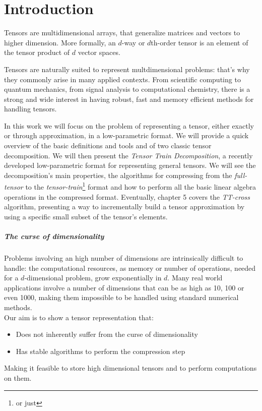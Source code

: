 \chapter{Introduction}
Tensors are multidimensional arrays, that generalize matrices and vectors to higher dimension. More formally, an $d$-way or $d$th-order tensor is an element of the tensor product of $d$ vector spaces.

Tensors are naturally suited to represent multdimensional problems: that's why they commonly arise in many applied contexts. From scientific computing to quantum mechanics, from signal analysis to computational chemistry, there is a strong and wide interest in having robust, fast and memory efficient methods for handling tensors.

In this work we will focus on the problem of representing a tensor, either exactly or through approximation, in a low-parametric format.
We will provide a quick overview of the basic definitions and tools and of two classic tensor decomposition. We will then present the \emph{Tensor Train Decomposition}, a recently developed low-parametric format for representing general tensors. We will see the decomposition's main properties, the algorithms for compressing from the \emph{full-tensor} to the \emph{tensor-train}\footnote{or just } format and how to perform all the basic linear algebra operations in the compressed format. Eventually, chapter 5 covers the \emph{TT-cross} algorithm, presenting a way to incrementally build a tensor approximation by using a specific small subset of the tensor's elements.

\paragraph{The curse of dimensionality}
Problems involving an high number of dimensions are intrinsically difficult to handle: the computational resources, as memory or number of operations, needed for a $d$-dimensional problem, grow exponentially in $d$. Many real world applications involve a number of dimensions that can be as high as 10, 100 or even 1000, making them impossible to be handled using standard numerical methods.\\
Our aim is to show a tensor representation that:
\begin{itemize}
\item Does not inherently suffer from the curse of dimensionality
\item Has stable algorithms to perform the compression step 
\end{itemize}
Making it feasible to store high dimensional tensors and to perform computations on them.
